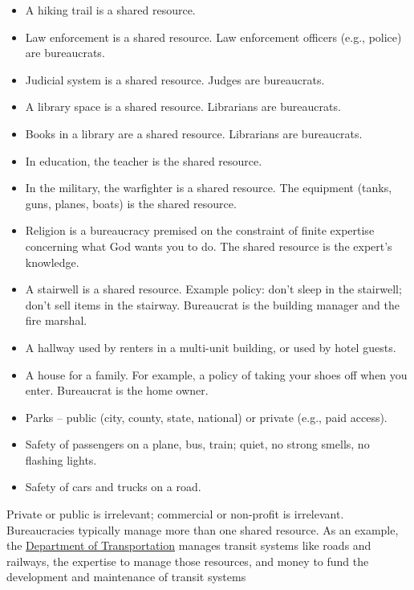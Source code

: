 {{\begin{itemize}
\item A hiking trail is a shared resource.
\item Law enforcement is a shared resource. Law enforcement officers (e.g., police) are bureaucrats. 
\item Judicial system is a shared resource. Judges are bureaucrats.
\item A library space is a shared resource. Librarians are bureaucrats.
\item Books in a library are a shared resource. Librarians are bureaucrats.
\item In education, the teacher is the shared resource. 
\item In the military, the warfighter is a shared resource. The equipment (tanks, guns, planes, boats) is the shared resource.
\item Religion is a bureaucracy premised on the constraint of finite expertise concerning what God wants you to do. The shared resource is the expert's knowledge.
\item A stairwell is a shared resource. Example policy: don't sleep in the stairwell; don't sell items in the stairway. Bureaucrat is the building manager and the fire marshal. 
\item A hallway used by renters in a multi-unit building, or used by hotel guests.
\item A house for a family. For example, a policy of taking your shoes off when you enter. Bureaucrat is the home owner.
\item Parks -- public (city, county, state, national) or private (e.g., paid access). 
\item Safety of passengers on a plane, bus, train; quiet, no strong smells, no flashing lights.
\item Safety of cars and trucks on a road. 
\end{itemize}
Private or public is irrelevant; commercial or non-profit is irrelevant. \\
Bureaucracies typically manage more than one shared resource.
As an example, the \href{https://en.wikipedia.org/wiki/Department_of_transportation}{Department of Transportation}
manages  transit systems like roads and railways, the expertise to manage those resources, and money to fund the development and maintenance of transit systems}
}


